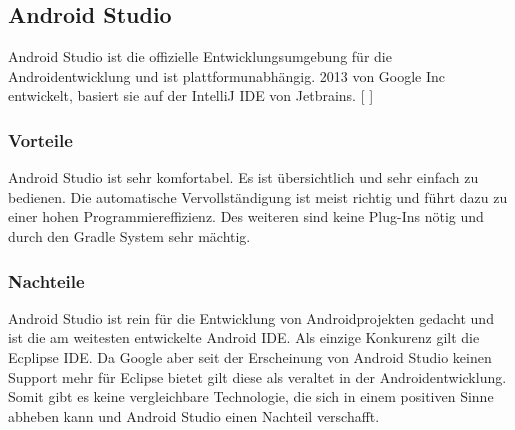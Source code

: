 \documentclass[FIPLY_base.tex]{subfiles}
\begin{document}
	\subsection{Android Studio}
	Android Studio ist die offizielle Entwicklungsumgebung für die Androidentwicklung und ist plattformunabhängig. 2013 von Google Inc entwickelt, basiert sie auf der IntelliJ IDE von Jetbrains.
	[ \cite{androidstudiodef}]  
	\subsubsection{Vorteile}
	Android Studio ist sehr komfortabel. Es ist übersichtlich und sehr einfach zu bedienen. Die automatische Vervollständigung ist meist richtig und führt dazu zu einer hohen Programmiereffizienz. Des weiteren sind keine Plug-Ins nötig und durch den Gradle System sehr mächtig.
	\subsubsection{Nachteile}
	Android Studio ist rein für die Entwicklung von Androidprojekten gedacht und ist die am weitesten entwickelte Android IDE. Als einzige \grqq{}Konkurenz\grqq{} gilt die Ecplipse IDE. Da Google aber seit der Erscheinung von Android Studio keinen Support mehr für Eclipse bietet gilt diese als veraltet in der Androidentwicklung. Somit gibt es keine vergleichbare Technologie, die sich in einem positiven Sinne abheben kann und Android Studio einen Nachteil verschafft.
	\ \\
\end{document}
